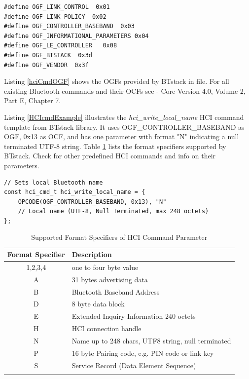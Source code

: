 \begin{lstlisting}[caption=hci.h defines possible OGFs used for creation of a HCI command., label=hciCmdOGF]
#define OGF_LINK_CONTROL  0x01
#define OGF_LINK_POLICY  0x02
#define OGF_CONTROLLER_BASEBAND  0x03
#define OGF_INFORMATIONAL_PARAMETERS 0x04
#define OGF_LE_CONTROLLER   0x08
#define OGF_BTSTACK  0x3d
#define OGF_VENDOR  0x3f
\end{lstlisting}

Listing \ref{hciCmdOGF} shows the OGFs provided by BTstack in  file.  For all existing Bluetooth commands and their OCFs see \BluetoothSpecificationURL{} - Core Version 4.0, Volume 2, Part E, Chapter 7.

Listing \ref{HCIcmdExample} illustrates the \emph{hci\_write\_local\_name} HCI command template from \mbox{BTstack} library. It uses  OGF\_CONTROLLER\_BASEBAND as OGF, 0x13 as OCF, and has one parameter with format "N" indicating a null terminated UTF-8 string. Table \ref{table:hciformat} lists the format specifiers supported by BTstack. Check  for other predefined HCI commands and info on their parameters.

\begin{lstlisting}[caption= Example of HCI command template., label=HCIcmdExample]
// Sets local Bluetooth name
const hci_cmd_t hci_write_local_name = {
    OPCODE(OGF_CONTROLLER_BASEBAND, 0x13), "N"
    // Local name (UTF-8, Null Terminated, max 248 octets)
};
\end{lstlisting}

\begin{table}\centering
\caption{Supported Format Specifiers of HCI Command Parameter}
\begin{tabular}{cl}\toprule
Format Specifier & Description\\ 
\midrule
1,2,3,4 & one to four byte value\\
A & 31 bytes advertising data \\
B & Bluetooth Baseband Address  \\
D & 8 byte data block \\
E & Extended Inquiry Information 240 octets \\
H & HCI connection handle \\
N & Name up to 248 chars, UTF8 string, null terminated \\
P & 16 byte Pairing code, e.g. PIN code or link key \\
S & Service Record (Data Element Sequence)\\
\bottomrule
\label{table:hciformat}
\end{tabular}
\end{table}

